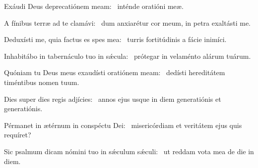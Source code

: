\item Exáudi Deus deprecatiónem meam:~\psstar{} inténde oratióni meæ.

\item A fínibus terræ ad te clamávi:~\psstar{} dum anxiarétur cor meum, in petra exaltásti me.

\item Deduxísti me, quia factus es spes mea:~\psstar{} turris fortitúdinis a fácie inimíci.

\item Inhabitábo in tabernáculo tuo in sǽcula:~\psstar{} prótegar in velaménto alárum tuárum.

\item Quóniam tu Deus meus exaudísti oratiónem meam:~\psstar{} dedísti hereditátem timéntibus nomen tuum.

\item Dies super dies regis adjícies:~\psstar{} annos ejus usque in diem generatiónis et generatiónis.

\item Pérmanet in ætérnum in conspéctu Dei:~\psstar{} misericórdiam et veritátem ejus quis requíret?

\item Sic psalmum dicam nómini tuo in sǽculum sǽculi:~\psstar{} ut reddam vota mea de die in diem.
